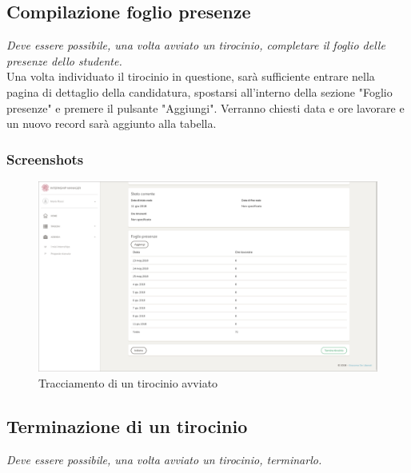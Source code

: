 \pagebreak
\subsection{Compilazione foglio presenze}

\textit{Deve essere possibile, una volta avviato un tirocinio, completare il foglio delle presenze dello studente.} \\

\noindent
Una volta individuato il tirocinio in questione, sarà sufficiente entrare nella pagina di dettaglio della candidatura, spostarsi all'interno della sezione "Foglio presenze" e premere il pulsante "Aggiungi". Verranno chiesti data e ore lavorare e un nuovo record sarà aggiunto alla tabella.

\subsubsection{Screenshots}
\begin{figure}[H]
	\centering
	\includegraphics[width=1\textwidth]{Figs/screenshots/internshiptrack}     
	\caption[Screenshot: tracciamento di un tirocinio avviato]{Tracciamento di un tirocinio avviato}
	\label{fig:screenshot:8}
\end{figure}

\pagebreak
\subsection{Terminazione di un tirocinio}

\textit{Deve essere possibile, una volta avviato un tirocinio, terminarlo.} \\

